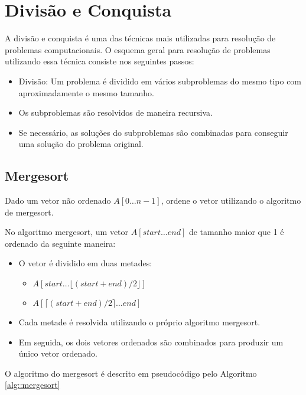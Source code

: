 \chapter[Divisão e Conquista]{Divisão e Conquista} 

A divisão e conquista é uma das técnicas mais utilizadas para resolução de problemas computacionais. O esquema geral para resolução de problemas utilizando essa técnica consiste nos seguintes passos:

\begin{itemize}
    \item Divisão: Um problema é dividido em vários subproblemas do mesmo tipo com aproximadamente o mesmo tamanho.
    \item Os subproblemas são resolvidos de maneira recursiva.
    \item Se necessário, as soluções do subproblemas são combinadas para conseguir uma solução do problema original.
\end{itemize}

\section{Mergesort}

\begin{exemplo}
Dado um vetor não ordenado $A[0 \ldots n-1]$, ordene o vetor utilizando o algoritmo de mergesort.
\end{exemplo}

No algoritmo mergesort, um  vetor $A[start \ldots end]$ de tamanho maior que 1 é ordenado da seguinte maneira:

\begin{itemize}
    \item O vetor é dividido em duas metades:
    \begin{itemize}
    \item $A[start \ldots \lfloor (start+end)/2 \rfloor ]$ 
    \item $A[ \lceil (start+end)/2 \rceil \ldots end ]$
    \end{itemize}
    \item Cada metade é resolvida utilizando o próprio algoritmo mergesort.
    \item Em seguida, os dois vetores ordenados são combinados para produzir um único vetor ordenado.
\end{itemize}

O algoritmo do mergesort é descrito em pseudocódigo pelo Algoritmo \ref{alg::mergesort}

